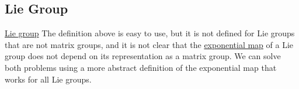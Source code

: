 \subsection{Lie Group}
\href{https://aimath.org/E8/liegroup.html#:~:text=Lie%20groups%20lie%20at%20the,are%20examples%20of%20smooth%20manifolds.}{Lie group}
The definition above is easy to use, but it is not defined for Lie groups that are not matrix groups,  and it is not clear that the \href{https://en.wikipedia.org/wiki/Lie_group}{exponential map}
of a Lie group does not depend on its representation as a matrix group. 
We can solve both problems using a more abstract definition of the exponential map that works for all Lie groups.


\newpage
